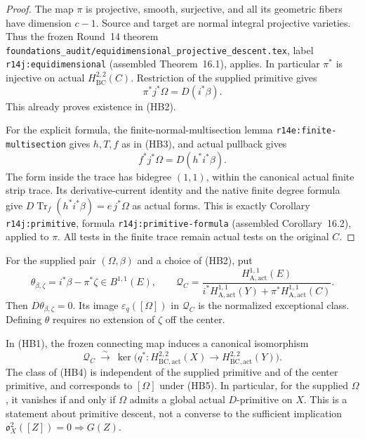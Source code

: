 \begin{proof}
The map $\pi$ is projective, smooth, surjective, and all its geometric
fibers have dimension $c-1$. Source and target are normal integral
projective varieties. Thus the frozen Round~14 theorem
\texttt{foundations\_audit/equidimensional\_projective\_descent.tex},
label \texttt{r14j:equidimensional} (assembled Theorem~16.1),
applies. In particular $\pi^*$ is injective on actual
$H_{\mathrm{BC}}^{2,2}(C)$. Restriction of the supplied primitive gives
\[
                  \pi^*j^*\Omega=D(i^*\beta).
\]
This already proves existence in (HB2).

For the explicit formula, the finite-normal-multisection lemma
\texttt{r14e:finite-multisection} gives $h,T,f$ as in (HB3), and
actual pullback gives
\[
              f^*j^*\Omega=D(h^*i^*\beta).
\]
The form inside the trace has bidegree $(1,1)$, within the canonical
actual finite strip trace. Its derivative-current identity and the
native finite degree formula give
$D\operatorname{Tr}_f(h^*i^*\beta)=e\,j^*\Omega$ as actual forms.
This is exactly Corollary \texttt{r14j:primitive}, formula
\texttt{r14j:primitive-formula} (assembled Corollary~16.2),
applied to $\pi$. All tests in the finite trace remain actual tests
on the original $C$.
\end{proof}

\begin{definition}
\label{r15:normalized-exceptional-class}
For the supplied pair $(\Omega,\beta)$ and a choice of (HB2), put
\[
 \theta_{\beta,\zeta}=i^*\beta-\pi^*\zeta\in B^{1,1}(E),
 \qquad
 \mathcal Q_C=
 \frac{H_{\mathrm A,\mathrm{act}}^{1,1}(E)}
 {i^*H_{\mathrm A,\mathrm{act}}^{1,1}(Y)
       +\pi^*H_{\mathrm A,\mathrm{act}}^{1,1}(C)}.
\tag{HB4}
\]
Then $D\theta_{\beta,\zeta}=0$.
Its image $\varepsilon_q([\Omega])$ in $\mathcal Q_C$ is the
normalized exceptional class. Defining $\theta$ requires no extension
of $\zeta$ off the center.
\end{definition}

\begin{proposition}
\label{r15:degree-two-all-centers}
In (HB1), the frozen connecting map induces a canonical isomorphism
\[
 \mathcal Q_C\ \xrightarrow{\ \sim\ }\
 \ker\bigl(q^*:H_{\mathrm{BC,act}}^{2,2}(X)
                  \longrightarrow H_{\mathrm{BC,act}}^{2,2}(Y)\bigr).
\tag{HB5}
\]
The class of (HB4) is independent of the supplied primitive and of the
center primitive, and corresponds to $[\Omega]$ under (HB5).
In particular, for the supplied $\Omega$, it vanishes if and only if
$\Omega$ admits a global actual $D$-primitive on $X$.
This is a statement about primitive descent, not a converse to the
sufficient implication $\mathfrak o_X^2([Z])=0\Rightarrow G(Z)$.
\end{proposition}

